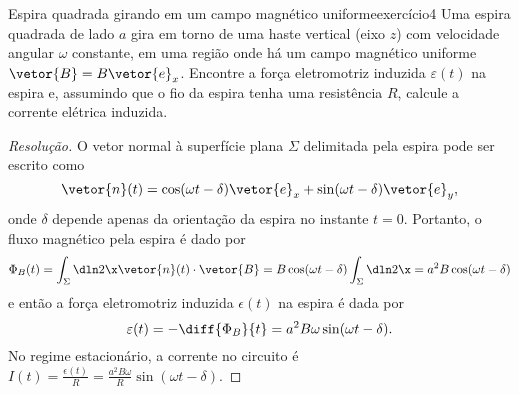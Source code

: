 \begin{exercício}{Espira quadrada girando em um campo magnético uniforme}{exercício4}
    Uma espira quadrada de lado \(a\) gira em torno de uma haste vertical (eixo \(z\)) com velocidade angular \(\omega\) constante, em uma região onde há um campo magnético uniforme \(\vetor{B} = B \vetor{e}_x\). Encontre a força eletromotriz induzida \(\varepsilon(t)\) na espira e, assumindo que o fio da espira tenha uma resistência \(R\), calcule a corrente elétrica induzida.
\end{exercício}
\begin{proof}[Resolução]
    O vetor normal à superfície plana \(\Sigma\) delimitada pela espira pode ser escrito como
    \begin{equation*}
        \vetor{n}(t) = \cos(\omega t - \delta)\vetor{e}_x + \sin(\omega t - \delta) \vetor{e}_y,
    \end{equation*}
    onde \(\delta\) depende apenas da orientação da espira no instante \(t = 0\). Portanto, o fluxo magnético pela espira é dado por
    \begin{equation*}
        \Phi_B(t) = \int_{\Sigma} \dln2\x \vetor{n}(t) \cdot \vetor{B} = B \cos(\omega t - \delta)\int_{\Sigma} \dln2\x  = a^2 B \cos(\omega t - \delta)
    \end{equation*}
    e então a força eletromotriz induzida \(\epsilon(t)\) na espira é dada por
    \begin{equation*}
        \varepsilon(t) = -\diff{\Phi_B}{t} = a^2 B \omega\sin(\omega t - \delta).
    \end{equation*}
    No regime estacionário, a corrente no circuito é \(I(t) = \frac{\epsilon(t)}{R} = \frac{a^2 B\omega}{R}\sin(\omega t - \delta)\).
\end{proof}
